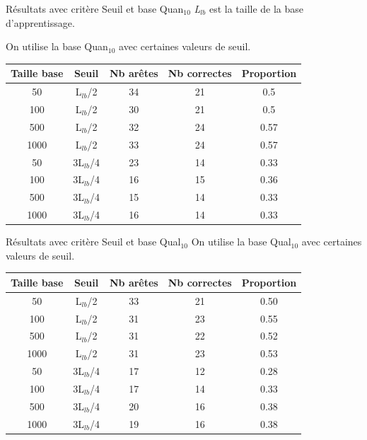 \documentclass{beamer}
\begin{document}
\begin{frame}{Résultats avec critère Seuil et base Quan$_{10}$}
\emph{L$_{lb}$} est la taille de la base d'apprentissage. 

On utilise la base Quan$_{10}$ avec certaines valeurs de seuil.

\begin{tabular}{|c|c|c|c|c|}
   \hline
   Taille base & Seuil & Nb arêtes & Nb correctes & Proportion\\
   \hline
   50 & L$_{lb}$/2 & 34 & 21 & 0.5  \\   
   \hline
   100 & L$_{lb}$/2 & 30 & 21 & 0.5  \\
   \hline
   500 & L$_{lb}$/2 & 32 & 24 & 0.57  \\
   \hline
   1000 & L$_{lb}$/2 & 33 & 24 & 0.57  \\
   \hline
   \hline
   50 & 3L$_{lb}$/4 & 23 & 14 & 0.33  \\
   \hline
   100 & 3L$_{lb}$/4 & 16 & 15 & 0.36  \\
   \hline
   500 & 3L$_{lb}$/4 & 15 & 14 & 0.33  \\
   \hline
   1000 & 3L$_{lb}$/4 & 16 & 14 & 0.33  \\
   \hline
\end{tabular}


\end{frame}

\begin{frame}{Résultats avec critère Seuil et base Qual$_{10}$}
On utilise la base Qual$_{10}$ avec certaines valeurs de seuil.
\begin{tabular}{|c|c|c|c|c|}
   \hline
   Taille base & Seuil & Nb arêtes & Nb correctes & Proportion\\
    \hline
   50 & L$_{lb}$/2 & 33 & 21 & 0.50  \\
   \hline
   100 & L$_{lb}$/2 & 31 & 23 & 0.55  \\
   \hline
   500 & L$_{lb}$/2 & 31 & 22 & 0.52  \\
   \hline
   1000 & L$_{lb}$/2 & 31 & 23 & 0.53  \\
   \hline
   \hline
   50 & 3L$_{lb}$/4 & 17 & 12 & 0.28  \\
   \hline
   100 & 3L$_{lb}$/4 & 17 & 14 & 0.33  \\
   \hline
   500 & 3L$_{lb}$/4 & 20 & 16 & 0.38  \\
   \hline
   1000 & 3L$_{lb}$/4 & 19 & 16 & 0.38  \\
   \hline
\end{tabular}
\end{frame}
\end{document}
